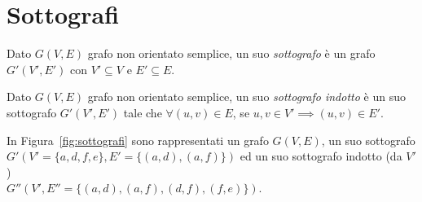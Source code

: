 \section{Sottografi}
\begin{defn}[sottografo]
Dato  $G(V,E)$ grafo non orientato semplice, un suo \emph{sottografo} è un grafo
$G'(V',E')$ con $V' \subseteq V$ e $E' \subseteq E$.
\end{defn}

\begin{defn}
Dato  $G(V,E)$ grafo non orientato semplice, un suo \emph{sottografo indotto} è un 
suo sottografo ${G'(V',E')}$ tale che ${\forall (u,v) \in E}$, se
${u,v \in V' \implies (u,v) \in E'}$.
\end{defn}

\begin{ese}
In Figura~\ref{fig:sottografi} sono rappresentati un grafo ${G(V,E)}$, un suo sottografo
${G'(V' = \{a,d,f,e\}, E'= \{ (a,d), (a,f) \})}$ ed un suo sottografo indotto (da $V'$)\\
${G''(V', E''= \{ (a,d), (a,f), (d,f), (f,e) \})}$.
\begin{figure}[!ht]
    \centering
\end{figure}
\end{ese}

